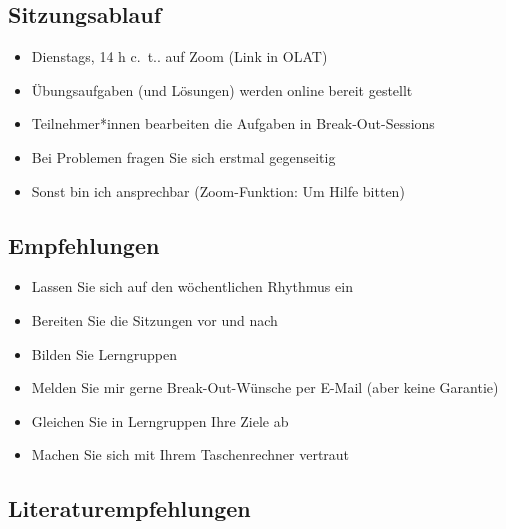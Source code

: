 \documentclass[
  11pt,
  ngerman,
  a4paper,
]{report}
\providecommand{\tightlist}{%
  \setlength{\itemsep}{0pt}\setlength{\parskip}{0pt}}
\begin{document}
\hypertarget{sitzungsablauf}{%
\subsection*{Sitzungsablauf}\label{sitzungsablauf}}

\begin{itemize}
\tightlist
\item
  Dienstags, 14 h c.~t.. auf Zoom (Link in OLAT)
\item
  Übungsaufgaben (und Lösungen) werden online bereit gestellt
\item
  Teilnehmer*innen bearbeiten die Aufgaben in Break-Out-Sessions
\item
  Bei Problemen fragen Sie sich erstmal gegenseitig
\item
  Sonst bin ich ansprechbar (Zoom-Funktion: Um Hilfe bitten)
\end{itemize}

\hypertarget{empfehlungen}{%
\subsection*{Empfehlungen}\label{empfehlungen}}

\begin{itemize}
\tightlist
\item
  Lassen Sie sich auf den wöchentlichen Rhythmus ein
\item
  Bereiten Sie die Sitzungen vor und nach
\item
  Bilden Sie Lerngruppen
\item
  Melden Sie mir gerne Break-Out-Wünsche per E-Mail (aber keine Garantie)
\item
  Gleichen Sie in Lerngruppen Ihre Ziele ab
\item
  Machen Sie sich mit Ihrem Taschenrechner vertraut
\end{itemize}

\hypertarget{literaturempfehlungen}{%
\subsection*{Literaturempfehlungen}\label{literaturempfehlungen}}
\end{document}
